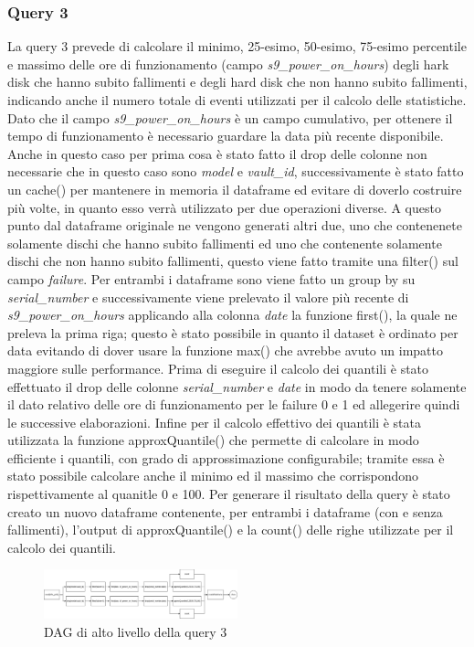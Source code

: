 \documentclass[conference]{IEEEtran}
\begin{document}
\subsubsection{Query 3}
La query 3 prevede di calcolare il minimo, 25-esimo, 50-esimo, 75-esimo percentile e massimo delle ore di funzionamento (campo \textit{s9\_power\_on\_hours}) degli hark disk che hanno subito fallimenti e degli hard disk che non hanno subito fallimenti, indicando anche il numero totale di eventi utilizzati per il calcolo delle statistiche.
Dato che il campo \textit{s9\_power\_on\_hours} è un campo cumulativo, per ottenere il tempo di funzionamento è necessario guardare la data più recente disponibile.
Anche in questo caso per prima cosa è stato fatto il drop delle colonne non necessarie che in questo caso sono \textit{model} e \textit{vault\_id}, successivamente è stato fatto un cache() per mantenere in memoria il dataframe ed evitare di doverlo costruire più volte, in quanto esso verrà utilizzato per due operazioni diverse. A questo punto dal dataframe originale ne vengono generati altri due, uno che contenenete solamente dischi che hanno subito fallimenti ed uno che contenente solamente dischi che non hanno subito fallimenti, questo viene fatto tramite una filter() sul campo \textit{failure}. Per entrambi i dataframe sono viene fatto un group by su \textit{serial\_number} e successivamente viene prelevato il valore più recente di \textit{s9\_power\_on\_hours} applicando alla colonna \textit{date} la funzione first(), la quale ne preleva la prima riga; questo è stato possibile in quanto il dataset è ordinato per data evitando di dover usare la funzione max() che avrebbe avuto un impatto maggiore sulle performance. Prima di eseguire il calcolo dei quantili è stato effettuato il drop delle colonne \textit{serial\_number} e \textit{date} in modo da tenere solamente il dato relativo delle ore di funzionamento per le failure 0 e 1 ed allegerire quindi le successive elaborazioni. Infine per il calcolo effettivo dei quantili è stata utilizzata la funzione approxQuantile() che permette di calcolare in modo efficiente i quantili, con grado di approssimazione configurabile; tramite essa è stato possibile calcolare anche il minimo ed il massimo che corrispondono rispettivamente al quanitle 0 e 100. Per generare il risultato della query è stato creato un nuovo dataframe contenente, per entrambi i dataframe (con e senza fallimenti), l'output di approxQuantile() e la count() delle righe utilizzate per il calcolo dei quantili.
\begin{figure}[H]
    \centerline{\includegraphics[width=0.5\textwidth]{res/query3_dag.png}}
    \caption{DAG di alto livello della query 3}
    \label{fig:dag_query3}
\end{figure}
\end{document}
